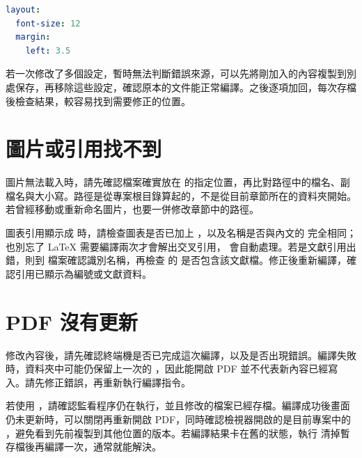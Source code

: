 \begin{lstlisting}[language=yaml]
layout:
  font-size: 12
  margin:
    left: 3.5
\end{lstlisting}

若一次修改了多個設定，暫時無法判斷錯誤來源，可以先將剛加入的內容複製到別處保存，再移除這些設定，確認原本的文件能正常編譯。之後逐項加回，每次存檔後檢查結果，較容易找到需要修正的位置。

\section{圖片或引用找不到}

圖片無法載入時，請先確認檔案確實放在  的指定位置，再比對路徑中的檔名、副檔名與大小寫。路徑是從專案根目錄算起的，不是從目前章節所在的資料夾開始。若曾經移動或重新命名圖片，也要一併修改章節中的路徑。

圖表引用顯示成  時，請檢查圖表是否已加上 \code{\label}，以及名稱是否與內文的 \code{\ref} 完全相同；也別忘了 \LaTeX{} 需要編譯兩次才會解出交叉引用， 會自動處理。若是文獻引用出錯，則到  檔案確認識別名稱，再檢查  的  是否包含該文獻檔。修正後重新編譯，確認引用已顯示為編號或文獻資料。

\section{PDF 沒有更新}

修改內容後，請先確認終端機是否已完成這次編譯，以及是否出現錯誤。編譯失敗時，資料夾中可能仍保留上一次的 ，因此能開啟 PDF 並不代表新內容已經寫入。請先修正錯誤，再重新執行編譯指令。

若使用 ，請確認監看程序仍在執行，並且修改的檔案已經存檔。編譯成功後畫面仍未更新時，可以關閉再重新開啟 PDF，同時確認檢視器開啟的是目前專案中的 ，避免看到先前複製到其他位置的版本。若編譯結果卡在舊的狀態，執行  清掉暫存檔後再編譯一次，通常就能解決。
